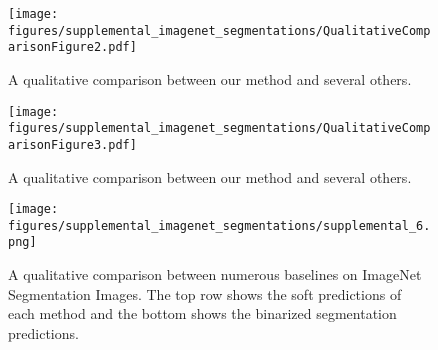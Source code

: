 \begin{figure*}[h!]
    \centering
    \texttt{[image: figures/supplemental\_imagenet\_segmentations/QualitativeComparisonFigure2.pdf]}
    \vspace{-0.2in}
    \caption{A qualitative comparison between our method and several others. }
    \label{fig:enter-label}
\end{figure*}

\begin{figure*}[h!]
    \centering
    \texttt{[image: figures/supplemental\_imagenet\_segmentations/QualitativeComparisonFigure3.pdf]}
    \vspace{-0.2in}
    \caption{A qualitative comparison between our method and several others. }
    \label{fig:enter-label}
\end{figure*}










\begin{figure*}
    \centering
    \texttt{[image: figures/supplemental\_imagenet\_segmentations/supplemental\_6.png]}
    \caption{A qualitative comparison between numerous baselines on ImageNet Segmentation Images. The top row shows the soft predictions of each method and the bottom shows the binarized segmentation predictions. }
    \label{fig:enter-label}
\end{figure*}

